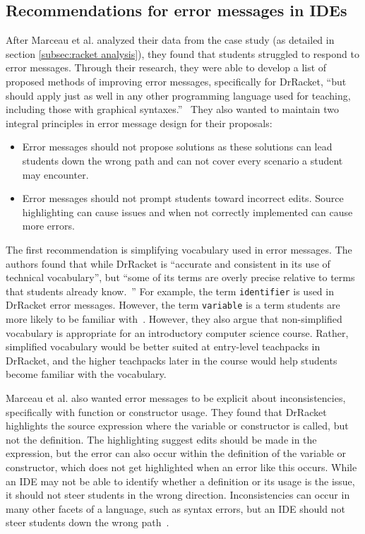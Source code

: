 \documentclass{sig-alternate}
\begin{document}
\subsection{Recommendations for error messages in IDEs}\label{subsec:error message rubric}
After Marceau et al. analyzed their data from the case study (as detailed in section \ref{subsec:racket analysis}), they found that students struggled to respond to error messages.
Through their research, they were able to develop a list of proposed methods of improving error messages, specifically for DrRacket, ``but  should apply just as well in any other programming language used for teaching, including those with
graphical syntaxes.''~\cite{Marceau:2011:MYL:2048237.2048241}
They also wanted to maintain two integral principles in error message design for their proposals:

\begin{itemize}
	\item Error messages should not propose solutions as these solutions can lead students down the wrong path and can not cover every scenario a student may encounter.
	\item Error messages should not prompt students toward incorrect edits. Source highlighting can cause issues and when not correctly implemented can cause more errors.
\end{itemize}

The first recommendation is simplifying vocabulary used in error messages.
The authors found that while DrRacket is ``accurate and consistent in its use of technical vocabulary'', but ``some of its terms are overly precise relative to terms that students already know.~\cite{Marceau:2011:MYL:2048237.2048241}''
For example, the term \texttt{identifier} is used in DrRacket error messages. However, the term \texttt{variable} is a term students are more likely to be familiar with~\cite{Marceau:2011:MYL:2048237.2048241}.
However, they also argue that non-simplified vocabulary is appropriate for an introductory computer science course.
Rather, simplified vocabulary would be better suited at entry-level teachpacks in DrRacket, and the higher teachpacks later in the course would help students become familiar with the vocabulary.

Marceau et al. also wanted error messages to be explicit about inconsistencies, specifically with function or constructor usage.
They found that DrRacket highlights the source expression where the variable or constructor is called, but not the definition.
The highlighting suggest edits should be made in the expression, but the error can also occur within the definition of the variable or constructor, which does not get highlighted when an error like this occurs.
While an IDE may not be able to identify whether a definition or its usage is the issue, it should not steer students in the wrong direction.
Inconsistencies can occur in many other facets of a language, such as syntax errors, but an IDE should not steer students down the wrong path~\cite{Marceau:2011:MYL:2048237.2048241}.
\end{document}
